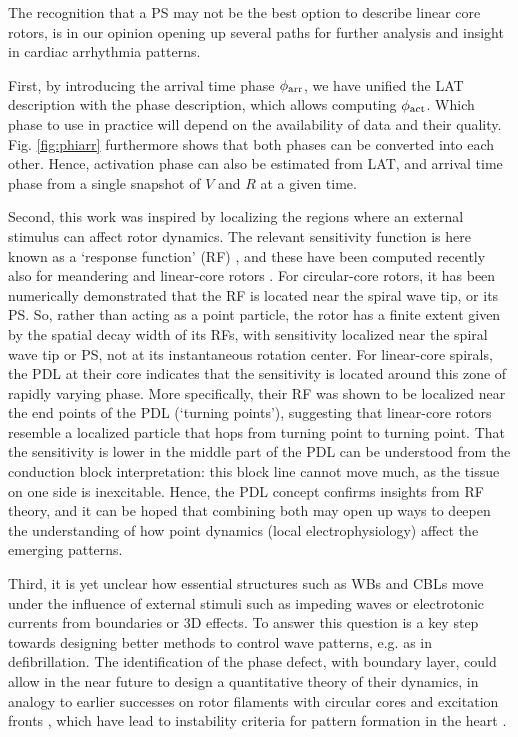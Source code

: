 \documentclass[aps,pre,amsfonts,amssymb,amsmath,twocolumn, superscriptaddress]{revtex4-1}
\newcommand{\phiact}{\ensuremath{\phi_{\rm act}}}
\newcommand{\phiarr}{\ensuremath{\phi_{\rm arr}}}
\begin{document}
The recognition that a PS may not be the best option to describe linear core rotors, is in our opinion opening up several paths for further analysis and insight in cardiac arrhythmia patterns. 

First, by introducing the arrival time phase $\phiarr$, we have unified the LAT description with the phase description, which allows computing $\phiact$. Which phase to use in practice will depend on the availability of data and their quality. Fig. \ref{fig:phiarr} furthermore shows that both phases can be converted into each other. Hence, activation phase can also be estimated from LAT, and arrival time phase from a single snapshot of $V$ and $R$ at a given time.  

Second, this work was inspired by localizing the regions where an external stimulus can affect rotor dynamics. The relevant sensitivity function is here known as a `response function' (RF) \citep{Biktasheva:2003}, and these have been computed recently also for meandering and linear-core rotors \citep{Marcotte:2015, Dierckx:2017}. 
For circular-core rotors, it has been numerically demonstrated that the RF is located near the spiral wave tip, or its PS. So, rather than acting as a point particle, the rotor has a finite extent given by the spatial decay width of its RFs, with sensitivity localized near the spiral wave tip or PS, not at its instantaneous rotation center. 
For linear-core spirals, the PDL at their core indicates that the sensitivity is located around this zone of rapidly varying phase. More specifically, their RF was shown to be localized near the end points of the PDL \citep{Dierckx:2017} (`turning points'), suggesting that linear-core rotors resemble a localized particle that hops from turning point to turning point. That the sensitivity is lower in the middle part of the PDL can be understood from the conduction block interpretation: this block line cannot move much, as the tissue on one side is inexcitable. Hence, the PDL concept confirms insights from RF theory, and it can be hoped that combining both may open up ways to deepen the understanding of how point dynamics (local electrophysiology) affect the emerging patterns. 

Third, it is yet unclear how essential structures such as WBs and CBLs move under the influence of external stimuli such as impeding waves or electrotonic currents from boundaries or 3D effects. To answer this question is a key step towards designing better methods to control wave patterns, e.g. as in defibrillation. The identification of the phase defect, with boundary layer, could allow in the near future to design a quantitative theory of their dynamics, in analogy to earlier successes on rotor filaments with circular cores \citep{Keener:1988} and excitation fronts \citep{Kuramoto:1980}, which have lead to instability criteria for pattern formation in the heart \citep{Biktashev:1994, Dierckx:2012}. 
\end{document}

